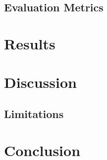 \documentclass[11pt]{article}
\begin{document}
\subsection{Evaluation Metrics}
\label{sec:metrics}

\section{Results}
\label{sec:results}



\section{Discussion}
\label{sec:discussion}


\subsection{Limitations}
\label{sec:limitations}

\section{Conclusion}
\label{sec:conclusion}




\end{document}
